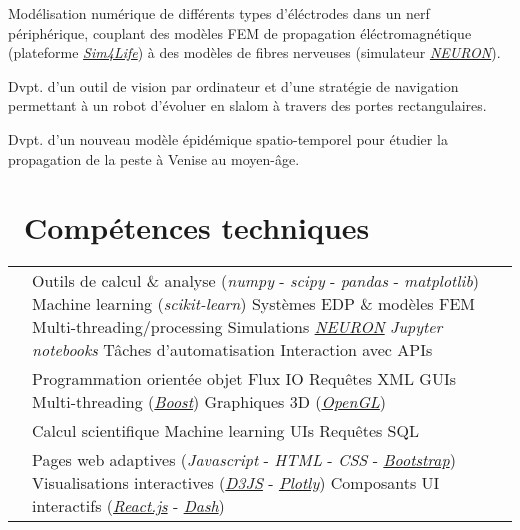 \documentclass[a4paper]{cv}
\begin{document}
\begin{minipage}[t]{0.6\textwidth}
Modélisation numérique de différents types d'éléctrodes dans un nerf périphérique, couplant des modèles FEM de propagation éléctromagnétique (plateforme \href{http://www.zurichmedtech.com/sim4life/}{\emph{Sim4Life}}) à des modèles de fibres nerveuses (simulateur \href{https://neuron.yale.edu/neuron/}{\emph{NEURON}}).
\sectionspace

Dvpt. d'un outil de vision par ordinateur et d'une stratégie de navigation permettant à un robot d'évoluer en slalom à travers des portes rectangulaires.
\sectionspace

Dvpt. d'un nouveau modèle épidémique spatio-temporel pour étudier la propagation de la peste à Venise au moyen-âge. 
\sectionspace

\section{\texorpdfstring{\faWrench}\ \ Compétences techniques}\sectionline

\def\arraystretch{1.5}
\begin{tabular}{R{0.21\textwidth} L{0.7\textwidth}}

 & Outils de calcul \& analyse (\emph{numpy} - \emph{scipy} - \emph{pandas} - \emph{matplotlib}) \tbl{} Machine learning (\emph{scikit-learn}) \tbl{} Systèmes EDP \& modèles FEM \tbl{} Multi-threading/processing \tbl{} Simulations \href{https://neuron.yale.edu/neuron/}{\emph{NEURON}} \tbl{} \emph{Jupyter notebooks} \tbl{} Tâches d'automatisation \tbl{}Interaction avec APIs\\

 & Programmation orientée objet \tbl{} Flux IO \tbl{} Requêtes XML \tbl{} GUIs \tbl{} Multi-threading (\href{https://www.boost.org/}{\emph{Boost}}) \tbl{} Graphiques 3D (\href{https://www.opengl.org/}{\emph{OpenGL}})\\

 & Calcul scientifique \tbl{} Machine learning \tbl{} UIs \tbl{} Requêtes SQL\\

 & Pages web adaptives (\emph{Javascript} - \emph{HTML} - \emph{CSS} - \href{http://getbootstrap.com/}{\emph{Bootstrap}}) \tbl{} Visualisations interactives (\href{https://d3js.org}{\emph{D3JS}} - \href{https://plot.ly/}{\emph{Plotly}}) \tbl{} Composants UI interactifs (\href{https://reactjs.org}{\emph{React.js}} - \href{https://dash.plot.ly/}{\emph{Dash}}) \\


\end{tabular}
\end{minipage}
\end{document}
